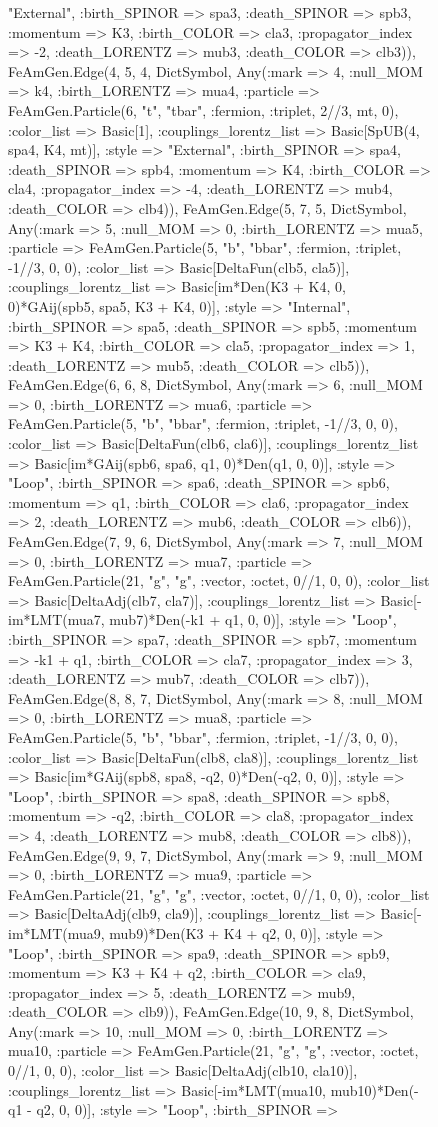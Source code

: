 \documentclass{revtex4}
\begin{document}
\begin{figure}[!htb]
\begin{center}
{"External", :birth_SPINOR => spa3, :death_SPINOR => spb3, :momentum => K3, :birth_COLOR => cla3, :propagator_index => -2, :death_LORENTZ => mub3, :death_COLOR => clb3)), FeAmGen.Edge(4, 5, 4, Dict{Symbol, Any}(:mark => 4, :null_MOM => k4, :birth_LORENTZ => mua4, :particle => FeAmGen.Particle(6, "t", "tbar", :fermion, :triplet, 2//3, mt, 0), :color_list => Basic[1], :couplings_lorentz_list => Basic[SpUB(4, spa4, K4, mt)], :style => "External", :birth_SPINOR => spa4, :death_SPINOR => spb4, :momentum => K4, :birth_COLOR => cla4, :propagator_index => -4, :death_LORENTZ => mub4, :death_COLOR => clb4)), FeAmGen.Edge(5, 7, 5, Dict{Symbol, Any}(:mark => 5, :null_MOM => 0, :birth_LORENTZ => mua5, :particle => FeAmGen.Particle(5, "b", "bbar", :fermion, :triplet, -1//3, 0, 0), :color_list => Basic[DeltaFun(clb5, cla5)], :couplings_lorentz_list => Basic[im*Den(K3 + K4, 0, 0)*GAij(spb5, spa5, K3 + K4, 0)], :style => "Internal", :birth_SPINOR => spa5, :death_SPINOR => spb5, :momentum => K3 + K4, :birth_COLOR => cla5, :propagator_index => 1, :death_LORENTZ => mub5, :death_COLOR => clb5)), FeAmGen.Edge(6, 6, 8, Dict{Symbol, Any}(:mark => 6, :null_MOM => 0, :birth_LORENTZ => mua6, :particle => FeAmGen.Particle(5, "b", "bbar", :fermion, :triplet, -1//3, 0, 0), :color_list => Basic[DeltaFun(clb6, cla6)], :couplings_lorentz_list => Basic[im*GAij(spb6, spa6, q1, 0)*Den(q1, 0, 0)], :style => "Loop", :birth_SPINOR => spa6, :death_SPINOR => spb6, :momentum => q1, :birth_COLOR => cla6, :propagator_index => 2, :death_LORENTZ => mub6, :death_COLOR => clb6)), FeAmGen.Edge(7, 9, 6, Dict{Symbol, Any}(:mark => 7, :null_MOM => 0, :birth_LORENTZ => mua7, :particle => FeAmGen.Particle(21, "g", "g", :vector, :octet, 0//1, 0, 0), :color_list => Basic[DeltaAdj(clb7, cla7)], :couplings_lorentz_list => Basic[-im*LMT(mua7, mub7)*Den(-k1 + q1, 0, 0)], :style => "Loop", :birth_SPINOR => spa7, :death_SPINOR => spb7, :momentum => -k1 + q1, :birth_COLOR => cla7, :propagator_index => 3, :death_LORENTZ => mub7, :death_COLOR => clb7)), FeAmGen.Edge(8, 8, 7, Dict{Symbol, Any}(:mark => 8, :null_MOM => 0, :birth_LORENTZ => mua8, :particle => FeAmGen.Particle(5, "b", "bbar", :fermion, :triplet, -1//3, 0, 0), :color_list => Basic[DeltaFun(clb8, cla8)], :couplings_lorentz_list => Basic[im*GAij(spb8, spa8, -q2, 0)*Den(-q2, 0, 0)], :style => "Loop", :birth_SPINOR => spa8, :death_SPINOR => spb8, :momentum => -q2, :birth_COLOR => cla8, :propagator_index => 4, :death_LORENTZ => mub8, :death_COLOR => clb8)), FeAmGen.Edge(9, 9, 7, Dict{Symbol, Any}(:mark => 9, :null_MOM => 0, :birth_LORENTZ => mua9, :particle => FeAmGen.Particle(21, "g", "g", :vector, :octet, 0//1, 0, 0), :color_list => Basic[DeltaAdj(clb9, cla9)], :couplings_lorentz_list => Basic[-im*LMT(mua9, mub9)*Den(K3 + K4 + q2, 0, 0)], :style => "Loop", :birth_SPINOR => spa9, :death_SPINOR => spb9, :momentum => K3 + K4 + q2, :birth_COLOR => cla9, :propagator_index => 5, :death_LORENTZ => mub9, :death_COLOR => clb9)), FeAmGen.Edge(10, 9, 8, Dict{Symbol, Any}(:mark => 10, :null_MOM => 0, :birth_LORENTZ => mua10, :particle => FeAmGen.Particle(21, "g", "g", :vector, :octet, 0//1, 0, 0), :color_list => Basic[DeltaAdj(clb10, cla10)], :couplings_lorentz_list => Basic[-im*LMT(mua10, mub10)*Den(-q1 - q2, 0, 0)], :style => "Loop", :birth_SPINOR => }
\end{center}
\end{figure}
\end{document}
